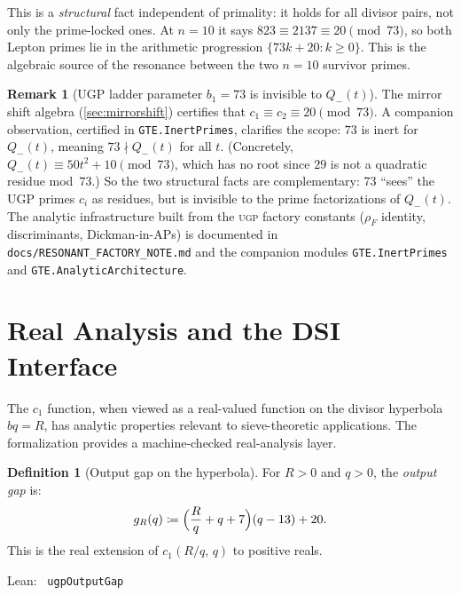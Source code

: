 \documentclass[11pt,a4paper]{article}
\newenvironment{leanref}%
  {\par\smallskip\noindent\begingroup\raggedright\textup{Lean:}~}%
  {\par\endgroup}
\theoremstyle{definition}
\newtheorem{definition}[theorem]{Definition}
\newtheorem{remark}[theorem]{Remark}
\newcommand{\ugp}{\textsc{ugp}}
\begin{document}
This is a \emph{structural} fact independent of primality: it holds for
all divisor pairs, not only the prime-locked ones.  At $n=10$ it says
$823 \equiv 2137 \equiv 20 \pmod{73}$, so both Lepton primes lie in the
arithmetic progression $\{73k + 20 : k \ge 0\}$.  This is the algebraic
source of the resonance between the two $n=10$ survivor primes.

\begin{remark}[UGP ladder parameter $b_1 = 73$ is invisible to $Q_-(t)$]\label{rem:73-inert}
The mirror shift algebra (\cref{sec:mirrorshift}) certifies that
$c_1 \equiv c_2 \equiv 20 \pmod{73}$.  A companion observation,
certified in \texttt{GTE.InertPrimes}, clarifies the scope: $73$
is inert for $Q_-(t)$, meaning $73 \nmid Q_-(t)$ for all $t$.
(Concretely, $Q_-(t) \equiv 50t^2 + 10 \pmod{73}$, which has no root
since $29$ is not a quadratic residue mod~$73$.)  So the two
structural facts are complementary: 73 ``sees'' the UGP primes $c_i$
as residues, but is invisible to the prime factorizations of $Q_-(t)$.
The analytic infrastructure built from the \ugp{} factory constants
($\rho_F$ identity, discriminants, Dickman-in-APs) is documented
in \texttt{docs/RESONANT\_FACTORY\_NOTE.md} and the companion modules
\texttt{GTE.InertPrimes} and \texttt{GTE.AnalyticArchitecture}.
\end{remark}

\section{Real Analysis and the DSI Interface}\label{sec:dsi}

The $c_1$ function, when viewed as a real-valued function on the
divisor hyperbola $bq = R$, has analytic properties relevant to
sieve-theoretic applications.  The formalization provides a
machine-checked real-analysis layer.

\begin{definition}[Output gap on the hyperbola]\label{def:outputgap}
For $R > 0$ and $q > 0$, the \emph{output gap} is:
\[
  g_R(q) \coloneqq \Bigl(\frac{R}{q} + q + 7\Bigr)(q - 13) + 20.
\]
This is the real extension of $c_1(R/q,\, q)$ to positive reals.

\begin{leanref} \lstinline|ugpOutputGap|
\end{leanref}
\end{definition}
\end{document}
